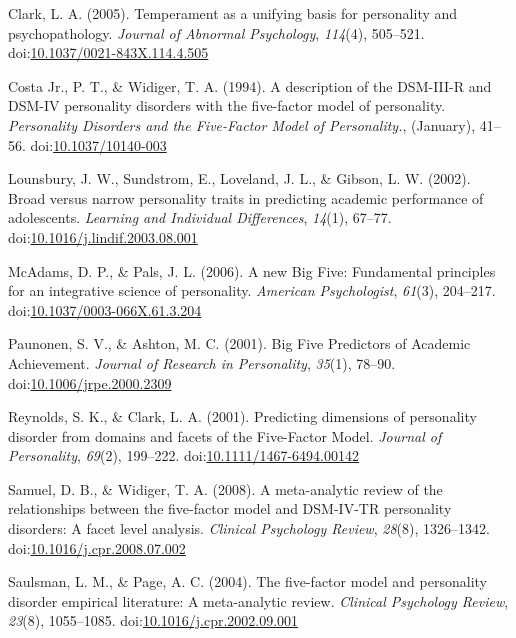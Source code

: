 \documentclass[man]{apa6}
\theoremstyle{definition}
\theoremstyle{definition}
\theoremstyle{definition}
\theoremstyle{remark}
\begin{document}
\hypertarget{refs}{}
\leavevmode\hypertarget{ref-Clark2005}{}%
Clark, L. A. (2005). Temperament as a unifying basis for personality and
psychopathology. \emph{Journal of Abnormal Psychology}, \emph{114}(4),
505--521.
doi:\href{https://doi.org/10.1037/0021-843X.114.4.505}{10.1037/0021-843X.114.4.505}

\leavevmode\hypertarget{ref-Widiger1994}{}%
Costa Jr., P. T., \& Widiger, T. A. (1994). A description of the
DSM-III-R and DSM-IV personality disorders with the five-factor model of
personality. \emph{Personality Disorders and the Five-Factor Model of
Personality.}, (January), 41--56.
doi:\href{https://doi.org/10.1037/10140-003}{10.1037/10140-003}

\leavevmode\hypertarget{ref-Lounsbury2002}{}%
Lounsbury, J. W., Sundstrom, E., Loveland, J. L., \& Gibson, L. W.
(2002). Broad versus narrow personality traits in predicting academic
performance of adolescents. \emph{Learning and Individual Differences},
\emph{14}(1), 67--77.
doi:\href{https://doi.org/10.1016/j.lindif.2003.08.001}{10.1016/j.lindif.2003.08.001}

\leavevmode\hypertarget{ref-McAdams2006a}{}%
McAdams, D. P., \& Pals, J. L. (2006). A new Big Five: Fundamental
principles for an integrative science of personality. \emph{American
Psychologist}, \emph{61}(3), 204--217.
doi:\href{https://doi.org/10.1037/0003-066X.61.3.204}{10.1037/0003-066X.61.3.204}

\leavevmode\hypertarget{ref-Paunonen2001}{}%
Paunonen, S. V., \& Ashton, M. C. (2001). Big Five Predictors of
Academic Achievement. \emph{Journal of Research in Personality},
\emph{35}(1), 78--90.
doi:\href{https://doi.org/10.1006/jrpe.2000.2309}{10.1006/jrpe.2000.2309}

\leavevmode\hypertarget{ref-ClarkReynolds2001}{}%
Reynolds, S. K., \& Clark, L. A. (2001). Predicting dimensions of
personality disorder from domains and facets of the Five-Factor Model.
\emph{Journal of Personality}, \emph{69}(2), 199--222.
doi:\href{https://doi.org/10.1111/1467-6494.00142}{10.1111/1467-6494.00142}

\leavevmode\hypertarget{ref-SamuelWidiger2008}{}%
Samuel, D. B., \& Widiger, T. A. (2008). A meta-analytic review of the
relationships between the five-factor model and DSM-IV-TR personality
disorders: A facet level analysis. \emph{Clinical Psychology Review},
\emph{28}(8), 1326--1342.
doi:\href{https://doi.org/10.1016/j.cpr.2008.07.002}{10.1016/j.cpr.2008.07.002}

\leavevmode\hypertarget{ref-SaulsmanPage2004}{}%
Saulsman, L. M., \& Page, A. C. (2004). The five-factor model and
personality disorder empirical literature: A meta-analytic review.
\emph{Clinical Psychology Review}, \emph{23}(8), 1055--1085.
doi:\href{https://doi.org/10.1016/j.cpr.2002.09.001}{10.1016/j.cpr.2002.09.001}
\end{document}

